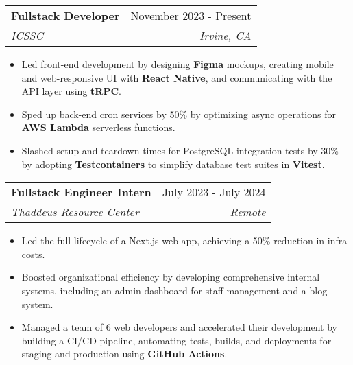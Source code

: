 \documentclass[letterpaper,11pt]{article}
\makeatletter
\newcommand{\resumeItem}[1]{
  \item\setstretch{.95}\small{
    {#1 \vspace{-2pt}}
  }
}
\newcommand{\resumeSubheading}[4]{
  \vspace{-2pt}\item
    \begin{tabular*}{0.97\textwidth}[t]{l@{\extracolsep{\fill}}r}
      \textbf{#1} & #2 \\
      \textit{\small#3} & \textit{\small #4} \\
    \end{tabular*}\vspace{-4.8pt}
}
\newcommand{\resumeItemListStart}{\begin{itemize}}
\newcommand{\resumeItemListEnd}{\end{itemize}\vspace{-5pt}}
\makeatother
\begin{document}
\resumeSubheading
{Fullstack Developer}{November 2023 - Present}
{ICSSC}{Irvine, CA}
\resumeItemListStart
\resumeItem{Led front-end development by designing \textbf{Figma} mockups, creating mobile and web-responsive UI with \textbf{React Native}, and communicating with the API layer using \textbf{tRPC}.}
\resumeItem{Sped up back-end cron services by 50\% by optimizing async operations for \textbf{AWS Lambda} serverless functions.}
\resumeItem{Slashed setup and teardown times for PostgreSQL integration tests by 30\% by adopting \textbf{Testcontainers} to simplify database test suites in \textbf{Vitest}.}
\resumeItemListEnd

\resumeSubheading
{Fullstack Engineer Intern}{July 2023 - July 2024}
{Thaddeus Resource Center}{Remote}
\resumeItemListStart
\resumeItem{Led the full lifecycle of a Next.js web app, achieving a 50\% reduction in infra costs.}
\resumeItem{Boosted organizational efficiency by developing comprehensive internal systems, including an admin dashboard for staff management and a blog system.}
\resumeItem{Managed a team of 6 web developers and accelerated their development by building a CI/CD pipeline, automating tests, builds, and deployments for staging and production using \textbf{GitHub Actions}.}
\resumeItemListEnd
\end{document}
